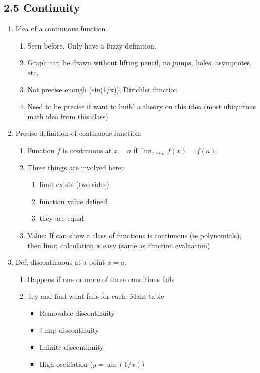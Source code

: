 \documentclass{article}
\begin{document}
\subsection{2.5 Continuity}
\begin{enumerate}

\item Idea of a continuous function
\begin{enumerate}
\item Seen before. Only have a fuzzy definition.
\item Graph can be drawn without lifting pencil, no jumps, holes, asymptotes, etc.
\item Not precise enough (sin(1/x)), Dirichlet function
\item Need to be precise if want to build a theory on this idea (most ubiquitous math idea from this class)
\end{enumerate}

\item Precise definition of continuous function: 
\begin{enumerate}
\item Function $f$ is continuous at $x=a$ if $\lim_{x\rightarrow a} f(x) = f(a)$.
\item Three things are involved here:
\begin{enumerate}
\item limit exists (two sides)
\item function value defined
\item they are equal
\end{enumerate}
\item Value: If can show a class of functions is continuous (ie polynomials), then limit calculation is easy (same as function evaluation)
\end{enumerate}

\item Def, discontinuous at a point $x=a$.
\begin{enumerate}
\item Happens if one or more of three conditions fails
\item Try and find what fails for each: Make table
\begin{itemize}
\item Removable discontinuity
\item Jump discontinuity
\item Infinite discontinuity
\item High oscillation ($y = \sin(1/x)$)
\end{itemize}
\end{enumerate}


\end{enumerate}
\end{document}
